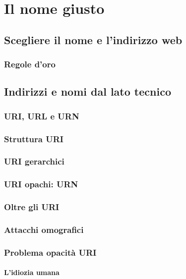 
\chapter{Il nome giusto}

	\section{Scegliere il nome e l'indirizzo web}
		
		\subsection{Regole d'oro}
	
	
	\section{Indirizzi e nomi dal lato tecnico}
	
		\subsection{URI, URL e URN}
		
		\subsection{Struttura URI}
		
		\subsection{URI gerarchici}
		
		\subsection{URI opachi: URN}
		
		\subsection{Oltre gli URI}
		
		\subsection{Attacchi omografici}
		
		\subsection{Problema opacità URI}
		
			\subsubsection{L'idiozia umana}
			
